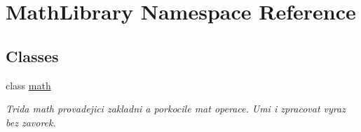\hypertarget{namespace_math_library}{}\section{Math\+Library Namespace Reference}
\label{namespace_math_library}
\subsection*{Classes}
\begin{DoxyCompactItemize}
\item 
class \mbox{\hyperlink{class_math_library_1_1math}{math}}
\begin{DoxyCompactList}\small\item\em Trida math provadejici zakladni a porkocile mat operace. Umi i zpracovat vyraz bez zavorek. \end{DoxyCompactList}\end{DoxyCompactItemize}
